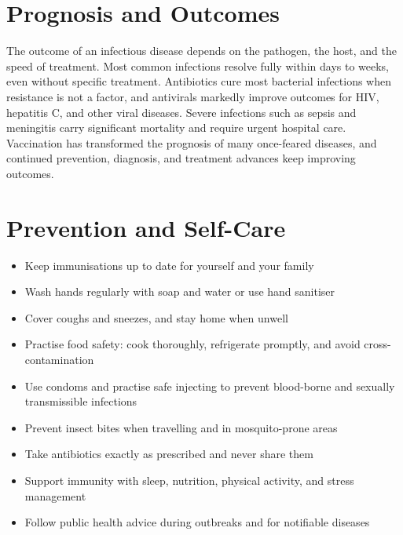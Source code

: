 \section*{Prognosis and Outcomes}
The outcome of an infectious disease depends on the pathogen, the host, and the speed of treatment. Most common infections resolve fully within days to weeks, even without specific treatment. Antibiotics cure most bacterial infections when resistance is not a factor, and antivirals markedly improve outcomes for HIV, hepatitis C, and other viral diseases. Severe infections such as sepsis and meningitis carry significant mortality and require urgent hospital care. Vaccination has transformed the prognosis of many once-feared diseases, and continued prevention, diagnosis, and treatment advances keep improving outcomes.

\section*{Prevention and Self-Care}
\begin{itemize}
    \item Keep immunisations up to date for yourself and your family
    \item Wash hands regularly with soap and water or use hand sanitiser
    \item Cover coughs and sneezes, and stay home when unwell
    \item Practise food safety: cook thoroughly, refrigerate promptly, and avoid cross-contamination
    \item Use condoms and practise safe injecting to prevent blood-borne and sexually transmissible infections
    \item Prevent insect bites when travelling and in mosquito-prone areas
    \item Take antibiotics exactly as prescribed and never share them
    \item Support immunity with sleep, nutrition, physical activity, and stress management
    \item Follow public health advice during outbreaks and for notifiable diseases
\end{itemize}

